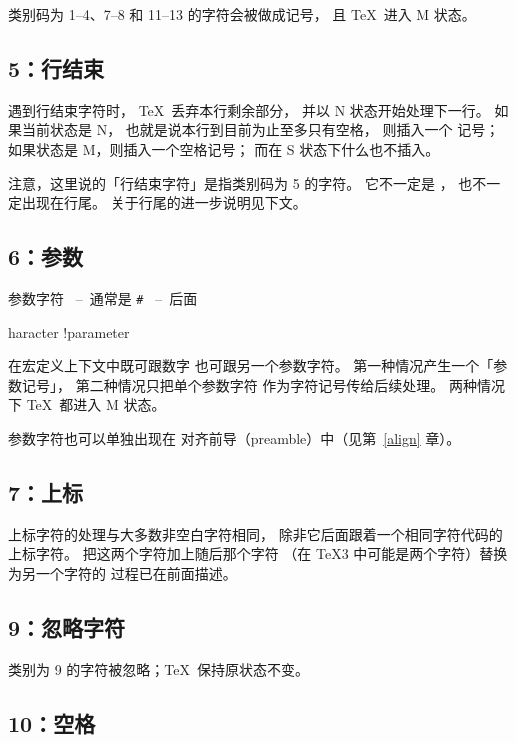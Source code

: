 \documentclass[a4paper]{rapport3}
\def\ldash{\unskip\ --\nobreak\ \ignorespaces}
\def\rdash{\unskip\nobreak\ --\ \ignorespaces}
\def\term#1\par{\index{#1}}
\begin{document}
类别码为 1--4、7--8 和 11--13 的字符会被做成记号，
且 \TeX\ 进入 {\italic M} 状态。

\subsection{5：行结束}

遇到行结束字符时，
\TeX\ 丢弃本行剩余部分，
并以 {\italic N} 状态开始处理下一行。
如果当前状态是 {\italic N}，
\awp
也就是说本行到目前为止至多只有空格，
则插入一个  记号；
如果状态是 {\italic M}，则插入一个空格记号；
而在 {\italic S} 状态下什么也不插入。

注意，这里说的「行结束字符」是指类别码为 5 的字符。
它不一定是 ，
也不一定出现在行尾。
关于行尾的进一步说明见下文。

\subsection{6：参数}

参数字符 \ldash 通常是 \verb=#= \rdash 后面
\term character !parameter\par
在宏定义上下文中既可跟数字 
\altt
也可跟另一个参数字符。
第一种情况产生一个「参数记号」，
第二种情况只把单个参数字符
作为字符记号传给后续处理。
两种情况下 \TeX\ 都进入 {\italic M} 状态。

参数字符也可以单独出现在
对齐前导（preamble）中（见第~\ref{align} 章）。

\subsection{7：上标}

上标字符的处理与大多数非空白字符相同，
除非它后面跟着一个相同字符代码的
上标字符。
把这两个字符加上随后那个字符
（在 \TeX3 中可能是两个字符）替换为另一个字符的
过程已在前面描述。

\subsection{9：忽略字符}

类别为 9 的字符被忽略；\TeX\ 保持原状态不变。

\subsection{10：空格}
\end{document}
